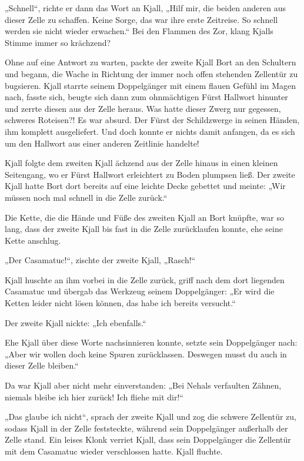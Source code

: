 \documentclass[10pt, a4paper, oneside]{book}
\begin{document}
„Schnell“, richte er dann das Wort an Kjall, „Hilf mir, die beiden anderen aus dieser Zelle zu schaffen. Keine Sorge, das war ihre erste Zeitreise. So schnell werden sie nicht wieder erwachen.“ Bei den Flammen des Zor, klang Kjalls Stimme immer so krächzend?

Ohne auf eine Antwort zu warten, packte der zweite Kjall Bort an den Schultern und begann, die Wache in Richtung der immer noch offen stehenden Zellentür zu bugsieren. Kjall starrte seinem Doppelgänger mit einem flauen Gefühl im Magen nach, fasste sich, beugte sich dann zum ohnmächtigen Fürst Hallwort hinunter und zerrte diesen aus der Zelle heraus. Was hatte dieser Zwerg nur gegessen, schweres Roteisen?! Es war absurd. Der Fürst der Schildzwerge in seinen Händen, ihm komplett ausgeliefert. Und doch konnte er nichts damit anfangen, da es sich um den Hallwort aus einer anderen Zeitlinie handelte!

Kjall folgte dem zweiten Kjall ächzend aus der Zelle hinaus in einen kleinen Seitengang, wo er Fürst Hallwort erleichtert zu Boden plumpsen ließ. Der zweite Kjall hatte Bort dort bereits auf eine leichte Decke gebettet und meinte: „Wir müssen noch mal schnell in die Zelle zurück.“

Die Kette, die die Hände und Füße des zweiten Kjall an Bort knüpfte, war so lang, dass der zweite Kjall bis fast in die Zelle zurücklaufen konnte, ehe seine Kette anschlug.

„Der Casamatuc!“, zischte der zweite Kjall, „Rasch!“

Kjall huschte an ihm vorbei in die Zelle zurück, griff nach dem dort liegenden Casamatuc und übergab das Werkzeug seinem Doppelgänger: „Er wird die Ketten leider nicht lösen können, das habe ich bereits versucht.“

Der zweite Kjall nickte: „Ich ebenfalls.“

Ehe Kjall über diese Worte nachsinnieren konnte, setzte sein Doppelgänger nach: „Aber wir wollen doch keine Spuren zurücklassen. Deswegen musst du auch in dieser Zelle bleiben.“

Da war Kjall aber nicht mehr einverstanden: „Bei Nehals verfaulten Zähnen, niemals bleibe ich hier zurück! Ich fliehe mit dir!“

„Das glaube ich nicht“, sprach der zweite Kjall und zog die schwere Zellentür zu, sodass Kjall in der Zelle feststeckte, während sein Doppelgänger außerhalb der Zelle stand. Ein leises Klonk verriet Kjall, dass sein Doppelgänger die Zellentür mit dem Casamatuc wieder verschlossen hatte. Kjall fluchte.
\end{document}
